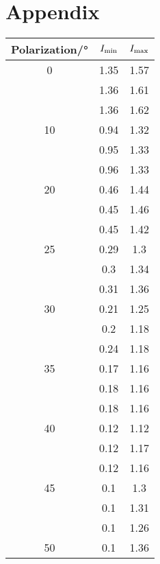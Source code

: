 \section{Appendix}
\begin{table}[H]
	\centering
	\begin{tabular}{S[table-format = 2.0] S S}
		\toprule
		{Polarization/°} & {$I_\text{min}$} & {$I_\text{max}$} \\
		                & 1.35      & 1.57      \\
		                 & 1.36      & 1.61      \\
		                 & 1.36      & 1.62      \\
		10               & 0.94      & 1.32      \\
		                 & 0.95      & 1.33      \\
		                 & 0.96      & 1.33      \\
		20               & 0.46      & 1.44      \\
		                 & 0.45      & 1.46      \\
		                 & 0.45      & 1.42      \\
		25               & 0.29      & 1.3       \\
		                 & 0.3       & 1.34      \\
		                 & 0.31      & 1.36      \\
		30               & 0.21      & 1.25      \\
		                 & 0.2       & 1.18      \\
		                 & 0.24      & 1.18      \\
		35               & 0.17      & 1.16      \\
		                 & 0.18      & 1.16      \\
		                 & 0.18      & 1.16      \\
		40               & 0.12      & 1.12      \\
		                 & 0.12      & 1.17      \\
		                 & 0.12      & 1.16      \\
		45               & 0.1       & 1.3       \\
		                 & 0.1       & 1.31      \\
		                 & 0.1       & 1.26      \\
		50               & 0.1       & 1.36      \\

\end{tabular}
\end{table}
